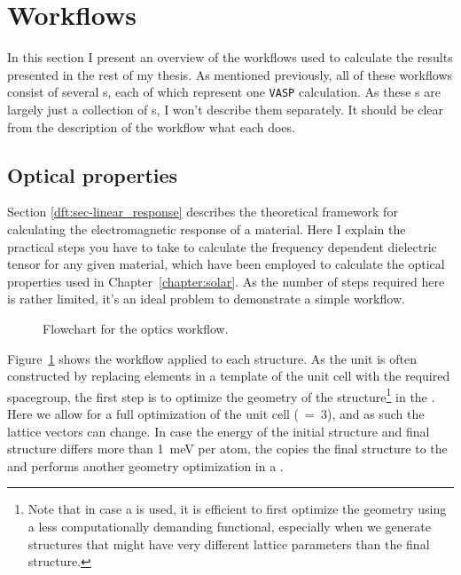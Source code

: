 \begin{refsection}
\begin{itemize}
\end{itemize}

\section{Workflows} \label{automation:sec-workflows}

In this section I present an overview of the workflows used to calculate the results presented in the rest of my thesis. As mentioned previously, all of these workflows consist of several s, each of which represent one \texttt{VASP} calculation. As these s are largely just a collection of s, I won't describe them separately. It should be clear from the description of the workflow what each  does.

\subsection{Optical properties} \label{automation:sec-optics}

Section \ref{dft:sec-linear_response} describes the theoretical framework for calculating the electromagnetic response of a material. Here I explain the practical steps you have to take to calculate the frequency dependent dielectric tensor for any given material, which have been employed to calculate the optical properties used in Chapter~\ref{chapter:solar}. As the number of steps required here is rather limited, it's an ideal problem to demonstrate a simple workflow.

\begin{figure}[ht]

\caption{\label{automation:fig-optics} Flowchart for the optics workflow.}
\end{figure}

Figure~\ref{automation:fig-optics} shows the workflow applied to each structure. As the unit is often constructed by replacing elements in a template of the unit cell with the required spacegroup, the first step is to optimize the geometry of the structure\footnote{Note that in case a  is used, it is efficient to first optimize the geometry using a less computationally demanding functional, especially when we generate structures that might have very different lattice parameters than the final structure.} in the . Here we allow for a full optimization of the unit cell (~=~3), and as such the lattice vectors can change. In case the energy of the initial structure and final structure differs more than 1~\si{\milli\electronvolt} per atom, the  copies the final structure  to the  and performs another geometry optimization in a .


\end{refsection}
